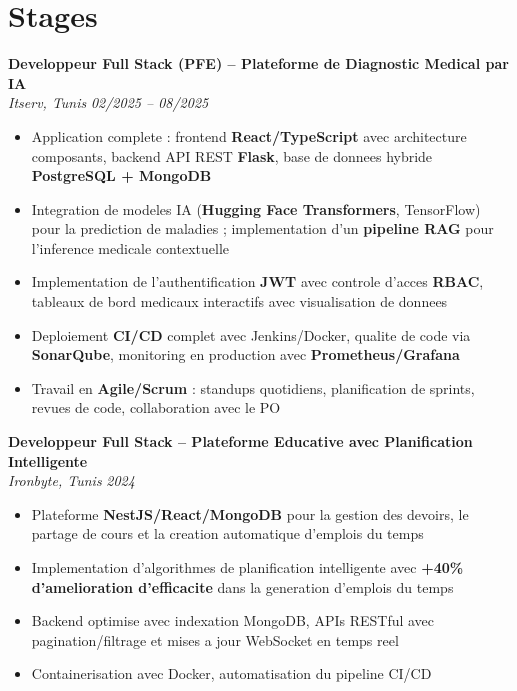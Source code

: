 \documentclass[10pt,a4paper]{article}
\begin{document}
\section*{Stages}
{\small

\textbf{Developpeur Full Stack (PFE) -- Plateforme de Diagnostic Medical par IA} \\[1pt]
\textit{Itserv, Tunis} \hfill \textit{02/2025 -- 08/2025}
\begin{itemize}
  \item Application complete : frontend \textbf{React/TypeScript} avec architecture composants, backend API REST \textbf{Flask}, base de donnees hybride \textbf{PostgreSQL + MongoDB}
  \item Integration de modeles IA (\textbf{Hugging Face Transformers}, TensorFlow) pour la prediction de maladies ; implementation d'un \textbf{pipeline RAG} pour l'inference medicale contextuelle
  \item Implementation de l'authentification \textbf{JWT} avec controle d'acces \textbf{RBAC}, tableaux de bord medicaux interactifs avec visualisation de donnees
  \item Deploiement \textbf{CI/CD} complet avec Jenkins/Docker, qualite de code via \textbf{SonarQube}, monitoring en production avec \textbf{Prometheus/Grafana}
  \item Travail en \textbf{Agile/Scrum} : standups quotidiens, planification de sprints, revues de code, collaboration avec le PO
\end{itemize}

\vspace{4pt}
\textbf{Developpeur Full Stack -- Plateforme Educative avec Planification Intelligente} \\[1pt]
\textit{Ironbyte, Tunis} \hfill \textit{2024}
\begin{itemize}
  \item Plateforme \textbf{NestJS/React/MongoDB} pour la gestion des devoirs, le partage de cours et la creation automatique d'emplois du temps
  \item Implementation d'algorithmes de planification intelligente avec \textbf{+40\% d'amelioration d'efficacite} dans la generation d'emplois du temps
  \item Backend optimise avec indexation MongoDB, APIs RESTful avec pagination/filtrage et mises a jour WebSocket en temps reel
  \item Containerisation avec Docker, automatisation du pipeline CI/CD
\end{itemize}

}
\end{document}
